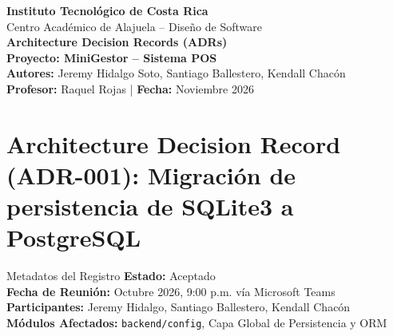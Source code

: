\documentclass[11pt,a4paper]{article}
\begin{document}
\begin{center}
    {\LARGE \textbf{Instituto Tecnológico de Costa Rica}}\\[0.2cm]
    {\large Centro Académico de Alajuela -- Diseño de Software}\\[0.4cm]
    {\Huge \textbf{Architecture Decision Records (ADRs)}}\\[0.3cm]
    {\Large \textbf{Proyecto: MiniGestor -- Sistema POS}}\\[0.4cm]
    \textbf{Autores:} Jeremy Hidalgo Soto, Santiago Ballestero, Kendall Chacón\\[0.1cm]
    \textbf{Profesor:} Raquel Rojas \quad | \quad \textbf{Fecha:} Noviembre 2026
\end{center}

\vspace{0.5cm}
\noindent{}

\vspace{0.8cm}
\tableofcontents
\newpage

\section{Architecture Decision Record (ADR-001): Migración de persistencia de SQLite3 a PostgreSQL}

\begin{adrbox}{Metadatos del Registro}
\textbf{Estado:} Aceptado \\
\textbf{Fecha de Reunión:} Octubre 2026, 9:00 p.m. vía Microsoft Teams \\
\textbf{Participantes:} Jeremy Hidalgo, Santiago Ballestero, Kendall Chacón \\
\textbf{Módulos Afectados:} \texttt{backend/config}, Capa Global de Persistencia y ORM
\end{adrbox}
\end{document}
